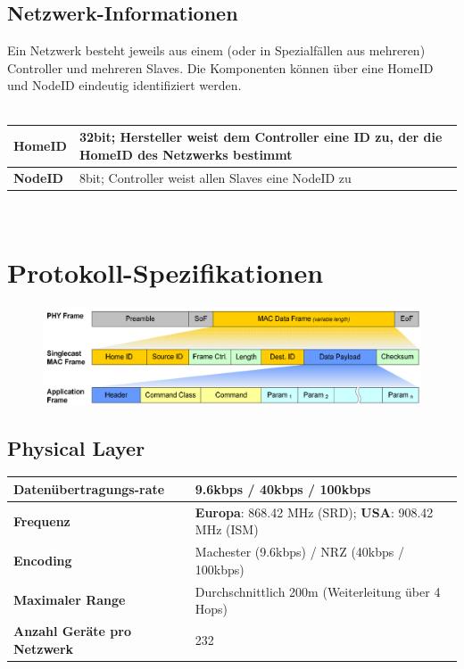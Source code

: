 \documentclass[a4paper,11pt]{article}
\begin{document}
\subsection*{Netzwerk-Informationen}
Ein Netzwerk besteht jeweils aus einem (oder in Spezialfällen aus mehreren) Controller und mehreren Slaves. Die Komponenten können über eine HomeID und NodeID eindeutig identifiziert werden.\\\\
\begin{tabular}{| p{3.5cm} | p{10cm} |}
	\hline
	\textbf{HomeID} & 32bit; Hersteller weist dem Controller eine ID zu, der die HomeID des Netzwerks bestimmt\\\hline
	\textbf{NodeID} & 8bit; Controller weist allen Slaves eine NodeID zu\\\hline
\end{tabular}~\newpage

\section*{Protokoll-Spezifikationen}
\begin{figure}[h!t]
	\includegraphics[width=\textwidth]{images/frame.png}
\end{figure}

\subsection*{Physical Layer}
\begin{tabular}{| p{3.5cm} | p{10cm} |}
	\hline
	\textbf{Datenübertragungs-rate} & 9.6kbps / 40kbps / 100kbps\\\hline
	\textbf{Frequenz} &  {\textbf{Europa}: 868.42 MHz (SRD); \textbf{USA}: 908.42 MHz (ISM)} \\\hline
	\textbf{Encoding} & Machester (9.6kbps) / NRZ (40kbps / 100kbps) \\\hline
	\textbf{Maximaler Range} & Durchschnittlich 200m (Weiterleitung über 4 Hops) \\\hline
	\textbf{Anzahl Geräte pro Netzwerk} & 232 \\\hline
\end{tabular}
\end{document}
